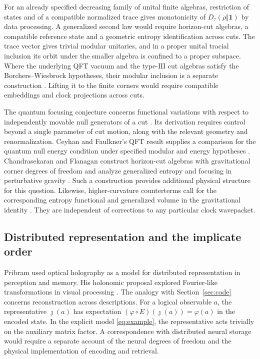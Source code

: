 \documentclass[11pt,a4paper]{article}
\numberwithin{equation}{section}
\theoremstyle{remark}
\newcommand{\one}{\mathbf 1}
\begin{document}
For an already specified decreasing family of unital finite algebras, restriction of states and of a compatible normalized trace gives monotonicity of $D_\tau(\rho\Vert\one)$ by data processing. A generalized second law would require horizon-cut algebras, a compatible reference state and a geometric entropy identification across cuts. The trace vector gives trivial modular unitaries, and in a proper unital tracial inclusion its orbit under the smaller algebra is confined to a proper subspace. Where the underlying QFT vacuum and the type-$\mathrm{III}$ cut algebras satisfy the Borchers--Wiesbrock hypotheses, their modular inclusion is a separate construction \cite{Borchers1992,Wiesbrock1993}. Lifting it to the finite corners would require compatible embeddings and clock projections across cuts.

The quantum focusing conjecture concerns functional variations with respect to independently movable null generators of a cut \cite{Bousso2016}. Its derivation requires control beyond a single parameter of cut motion, along with the relevant geometry and renormalization. Ceyhan and Faulkner's QFT result supplies a comparison for the quantum null energy condition under specified modular and energy hypotheses \cite{Ceyhan2020}. Chandrasekaran and Flanagan construct horizon-cut algebras with gravitational corner degrees of freedom and analyze generalized entropy and focusing in perturbative gravity \cite{ChandrasekaranFlanagan2026}. Such a construction provides additional physical structure for this question. Likewise, higher-curvature counterterms call for the corresponding entropy functional and generalized volume in the gravitational identity \cite{Bueno2017,Dong2014}. They are independent of corrections to any particular clock wavepacket.

\subsection{Distributed representation and the implicate order}
\label{sec:historical-analogies}

Pribram used optical holography as a model for distributed representation in perception and memory. His holonomic proposal explored Fourier-like transformations in visual processing \cite{Pribram1977}. The analogy with Section~\ref{sec:code} concerns reconstruction across descriptions. For a logical observable $a$, the representative $\jmath(a)$ has expectation $(\varphi\circ E)(\jmath(a))=\varphi(a)$ in the encoded state. In the explicit model \eqref{eq:example}, the representative acts trivially on the auxiliary matrix factor. A correspondence with distributed neural storage would require a separate account of the neural degrees of freedom and the physical implementation of encoding and retrieval.
\end{document}
